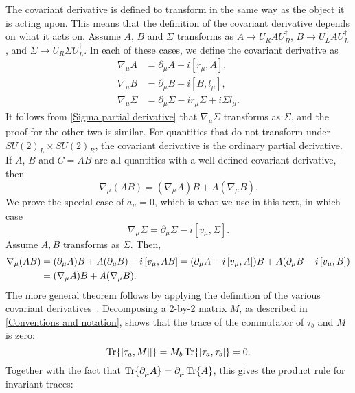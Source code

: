 The covariant derivative is defined to transform in the same way as the object it is acting upon.
This means that the definition of the covariant derivative depends on what it acts on.
Assume $A$, $B$ and $\Sigma$ transforms as $A \rightarrow U_R A U_R^\dagger$, $B \rightarrow U_L A U_L^\dagger$, and $\Sigma \rightarrow U_R \Sigma U_L^\dagger$.
In each of these cases, we define the covariant derivative as
\begin{align}
    \label{covariant derivative general}
    \nabla_\mu A &= \partial_\mu A - i [r_\mu, A], \\
    \nabla_\mu B &= \partial_\mu B - i [B, l_\mu], \\
    \nabla_\mu \Sigma &= \partial_\mu \Sigma - i r_\mu \Sigma + i \Sigma l_\mu.
\end{align}
It follows from \cref{Sigma partial derivative} that $\nabla_\mu \Sigma$ transforms as $\Sigma$, and the proof for the other two is similar.
For quantities that do not transform under $SU(2)_L\times SU(2)_R$, the covariant derivative is the ordinary partial derivative.
If $A$, $B$ and $C = AB$ are all quantities with a well-defined covariant derivative, then
\begin{equation}
    \nabla_\mu (AB) = (\nabla_\mu A) B + A (\nabla_\mu B).
\end{equation}
We prove the special case of $a_\mu = 0$, which is what we use in this text, in which case
\begin{equation}
    \nabla_\mu \Sigma = \partial_\mu \Sigma - i [v_\mu, \Sigma].
\end{equation}
Assume $A, B$ transforms as $\Sigma$. 
Then,
\begin{align*}
    \nabla_\mu (A B)
    & = (\partial_\mu A) B + A (\partial_\mu B) - i \left[v_\mu, AB \right]
    = (\partial_\mu A - i \left[v_\mu, A \right])B + A(\partial_\mu B- i \left[v_\mu, B \right])\\
    & = (\nabla_\mu A)B + A (\nabla_\mu B).
\end{align*}
The more general theorem follows by applying the definition of the various covariant derivatives~\cite{Scherer:PhysRevD.53.315}.
Decomposing a 2-by-2 matrix $M$, as described in \autoref{Conventions and notation}, shows that the trace of the commutator of $\tau_b$ and $M$ is zero:
\begin{equation*}
    \Tr{\left[\tau_a, M \right]]} = M_b\Tr{ \left[\tau_a, \tau_b \right]} = 0.
\end{equation*}
Together with the fact that $\Tr{\partial_\mu A} = \partial_\mu \Tr{A}$, this gives the product rule for invariant traces:
